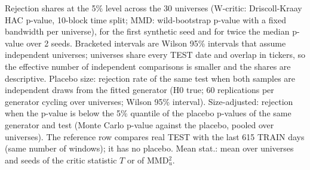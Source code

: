Rejection shares at the 5\% level across the 30 universes (W-critic: Driscoll-Kraay HAC p-value, 10-block time split; MMD: wild-bootstrap p-value with a fixed bandwidth per universe), for the first synthetic seed and for twice the median p-value over 2 seeds. Bracketed intervals are Wilson 95\% intervals that assume independent universes; universes share every TEST date and overlap in tickers, so the effective number of independent comparisons is smaller and the shares are descriptive. Placebo size: rejection rate of the same test when both samples are independent draws from the fitted generator (H0 true; 60 replications per generator cycling over universes; Wilson 95\% interval). Size-adjusted: rejection when the p-value is below the 5\% quantile of the placebo p-values of the same generator and test (Monte Carlo p-value against the placebo, pooled over universes). The reference row compares real TEST with the last 615 TRAIN days (same number of windows); it has no placebo. Mean stat.: mean over universes and seeds of the critic statistic $T$ or of MMD$^2_u$.
